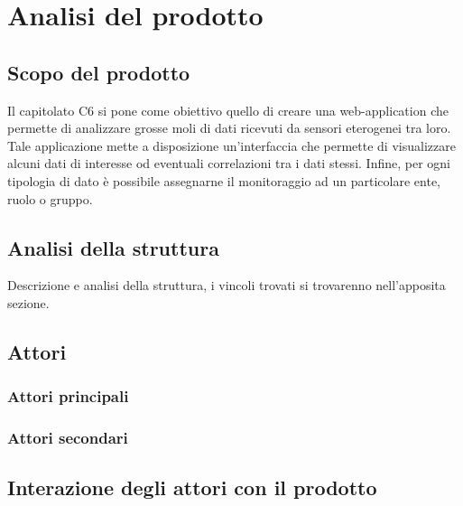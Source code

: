 \section{Analisi del prodotto}
	\subsection{Scopo del prodotto}
		Il capitolato C6 si pone come obiettivo quello di creare una web-application che permette di analizzare grosse moli di dati ricevuti da sensori eterogenei tra loro. Tale applicazione mette a disposizione un'interfaccia che permette di visualizzare alcuni dati di interesse od eventuali correlazioni tra i dati stessi. Infine, per ogni tipologia di dato è possibile assegnarne il monitoraggio ad un particolare ente, ruolo o gruppo.
		
	\subsection{Analisi della struttura}
	Descrizione e analisi della struttura, i vincoli trovati si trovarenno nell'apposita sezione.
	\subsection{Attori}
		\subsubsection{Attori principali}
		\subsubsection{Attori secondari}
	\subsection{Interazione degli attori con il prodotto}
